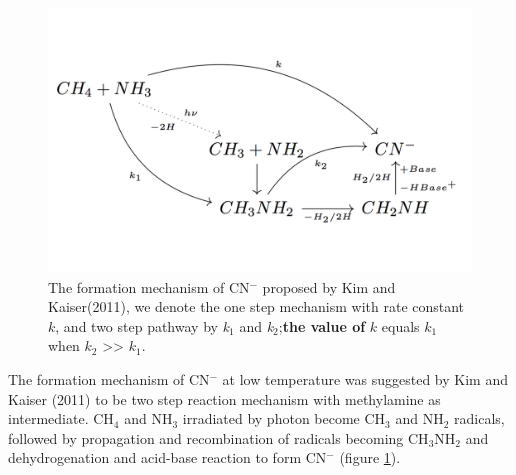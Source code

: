 \begin{figure}
\centering
\includegraphics[width=\textwidth]{figures/chapter3/CNmechanism}
\caption{The formation mechanism of CN$^-$ proposed by Kim and Kaiser(2011)\cite{kim}, we denote the one step mechanism with rate constant $k$, and two step pathway by \textit{k$_1$} and \textit{k$_2$};\textbf{the value of} $k$ equals $k_1$ when $k_2$ >> $k_1$.}
\label{fig:CNmechanism}
\end{figure}

The formation mechanism of CN$^-$ at low temperature was suggested by Kim and Kaiser (2011) to be two step reaction mechanism with methylamine as intermediate\cite{kim}. CH$_4$ and NH$_3$ irradiated by photon become CH$_3$ and NH$_2$ radicals, followed by propagation and recombination of radicals becoming CH$_3$NH$_2$ and dehydrogenation and acid-base reaction to form CN$^-$ (figure \ref{fig:CNmechanism}).


